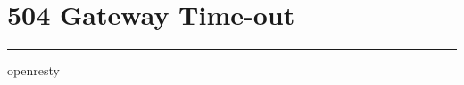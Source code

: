 \hypertarget{504-gateway-time-out}{%
\section{504 Gateway Time-out}\label{504-gateway-time-out}}

\begin{center}\rule{0.5\linewidth}{\linethickness}\end{center}

openresty
